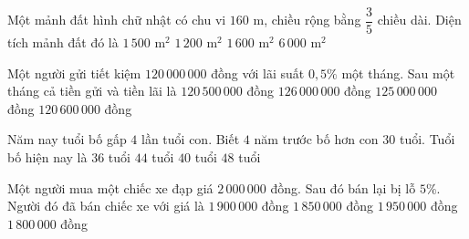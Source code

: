 \begin{ex} %
Một mảnh đất hình chữ nhật có chu vi $160\text{ m}$, chiều rộng bằng $\dfrac{3}{5}$ chiều dài. Diện tích mảnh đất đó là
\choice
{\True $1\,500\text{ m}^2$}
{$1\,200\text{ m}^2$}
{$1\,600\text{ m}^2$}
{$6\,000\text{ m}^2$}
\end{ex}

\begin{ex} %
Một người gửi tiết kiệm $120\,000\,000$ đồng với lãi suất $0{,}5\%$ một tháng. Sau một tháng cả tiền gửi và tiền lãi là
\choice
{$120\,500\,000$ đồng}
{$126\,000\,000$ đồng}
{$125\,000\,000$ đồng}
{\True $120\,600\,000$ đồng}
\end{ex}

\begin{ex} %
Năm nay tuổi bố gấp $4$ lần tuổi con. Biết $4$ năm trước bố hơn con $30$ tuổi. Tuổi bố hiện nay là
\choice
{$36$ tuổi}
{$44$ tuổi}
{\True $40$ tuổi}
{$48$ tuổi}
\end{ex}

\begin{ex} %
Một người mua một chiếc xe đạp giá $2\,000\,000$ đồng. Sau đó bán lại bị lỗ $5\%$. Người đó đã bán chiếc xe với giá là
\choice
{\True $1\,900\,000$ đồng}
{$1\,850\,000$ đồng}
{$1\,950\,000$ đồng}
{$1\,800\,000$ đồng}
\end{ex}

